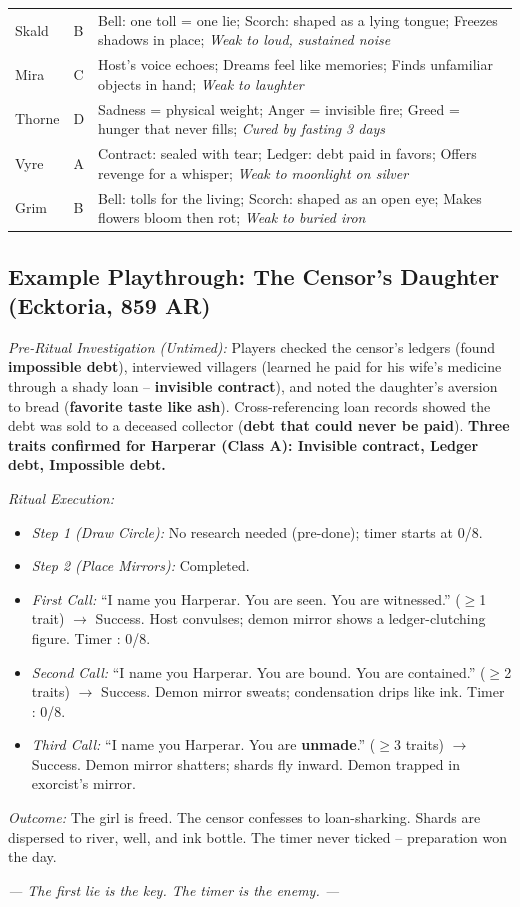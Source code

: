 \begin{table}[h!]
\begin{tabular}{@{}l l p{5.5cm}@{}}
Skald & B & Bell: one toll = one lie; Scorch: shaped as a lying tongue; Freezes shadows in place; \textit{Weak to loud, sustained noise} \\
Mira & C & Host's voice echoes; Dreams feel like memories; Finds unfamiliar objects in hand; \textit{Weak to laughter} \\
Thorne & D & Sadness = physical weight; Anger = invisible fire; Greed = hunger that never fills; \textit{Cured by fasting 3 days} \\
Vyre & A & Contract: sealed with tear; Ledger: debt paid in favors; Offers revenge for a whisper; \textit{Weak to moonlight on silver} \\
Grim & B & Bell: tolls for the living; Scorch: shaped as an open eye; Makes flowers bloom then rot; \textit{Weak to buried iron} \\
\bottomrule
\end{tabular}
\label{tab:demons}
\end{table}

\subsection*{Example Playthrough: The Censor's Daughter (Ecktoria, 859 AR)}
\begin{tcolorbox}[colback=black!3,colframe=blue!60!black,title=The Censor's Daughter,breakable]
\textit{Pre-Ritual Investigation (Untimed):}  
Players checked the censor's ledgers (found \textbf{impossible debt}), interviewed villagers (learned he paid for his wife's medicine through a shady loan -- \textbf{invisible contract}), and noted the daughter's aversion to bread (\textbf{favorite taste like ash}). Cross-referencing loan records showed the debt was sold to a deceased collector (\textbf{debt that could never be paid}). \textbf{Three traits confirmed for Harperar (Class A): Invisible contract, Ledger debt, Impossible debt.}

\textit{Ritual Execution:}
\begin{itemize}
  \item \textit{Step 1 (Draw Circle):} No research needed (pre-done); timer starts at 0/8.
  \item \textit{Step 2 (Place Mirrors):} Completed.
  \item \textit{First Call:} ``I name you Harperar. You are seen. You are witnessed.'' ($\ge$1 trait) $\rightarrow$ Success. Host convulses; demon mirror shows a ledger-clutching figure. Timer : 0/8.
  \item \textit{Second Call:} ``I name you Harperar. You are bound. You are contained.'' ($\ge$2 traits) $\rightarrow$ Success. Demon mirror sweats; condensation drips like ink. Timer : 0/8.
  \item \textit{Third Call:} ``I name you Harperar. You are \textbf{unmade}.'' ($\ge$3 traits) $\rightarrow$ Success. Demon mirror shatters; shards fly inward. Demon trapped in exorcist's mirror.
\end{itemize}
\textit{Outcome:} The girl is freed. The censor confesses to loan-sharking. Shards are dispersed to river, well, and ink bottle. The timer never ticked -- preparation won the day.
\end{tcolorbox}

\noindent\textcolor{witnessSilver}{\textit{--- The first lie is the key. The timer is the enemy. ---}}